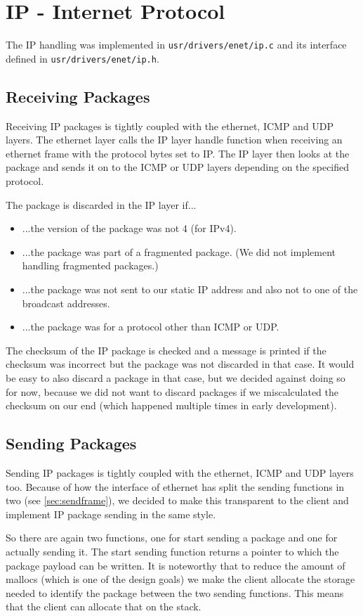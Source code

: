\section{IP - Internet Protocol}
The IP handling was implemented in \verb|usr/drivers/enet/ip.c| and its interface defined in \verb|usr/drivers/enet/ip.h|.

\subsection{Receiving Packages}
Receiving IP packages is tightly coupled with the ethernet, ICMP and UDP layers. The ethernet layer calls the IP layer handle function when receiving an ethernet frame with the protocol bytes set to IP. The IP layer then looks at the package and sends it on to the ICMP or UDP layers depending on the specified protocol.

The package is discarded in the IP layer if...
\begin{itemize}
    \item ...the version of the package was not 4 (for IPv4).
    \item ...the package was part of a fragmented package. (We did not implement handling fragmented packages.)
    \item ...the package was not sent to our static IP address and also not to one of the broadcast addresses.
    \item ...the package was for a protocol other than ICMP or UDP.
\end{itemize}

The checksum of the IP package is checked and a message is printed if the checksum was incorrect but the package was not discarded in that case. It would be easy to also discard a package in that case, but we decided against doing so for now, because we did not want to discard packages if we miscalculated the checksum on our end (which happened multiple times in early development).

\subsection{Sending Packages}
Sending IP packages is tightly coupled with the ethernet, ICMP and UDP layers too. Because of how the interface of ethernet has split the sending functions in two (see \ref{sec:sendframe}), we decided to make this transparent to the client and implement IP package sending in the same style.

So there are again two functions, one for start sending a package and one for actually sending it. The start sending function returns a pointer to which the package payload can be written. It is noteworthy that to reduce the amount of mallocs (which is one of the design goals) we make the client allocate the storage needed to identify the package between the two sending functions. This means that the client can allocate that on the stack.

